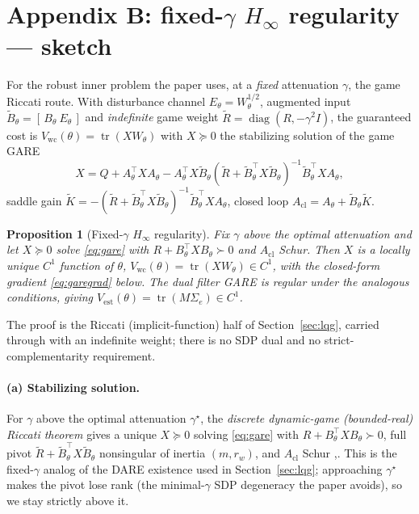 \documentclass[11pt]{article}
\newtheorem{proposition}{Proposition}
\theoremstyle{definition}
\DeclareMathOperator{\tr}{tr}
\DeclareMathOperator{\diag}{diag}
\newcommand{\Acl}{A_{\mathrm{cl}}}
\newcommand{\Th}{\theta}
\newcommand{\half}{{1/2}}
\newcommand{\Vwc}{V_{\mathrm{wc}}}
\newcommand{\Vest}{V_{\mathrm{est}}}
\begin{document}
\section{Appendix B: fixed-$\gamma$ $H_\infty$ regularity --- sketch}\label{sec:hinf}

For the robust inner problem the paper uses, at a \emph{fixed} attenuation
$\gamma$, the game Riccati route. With disturbance channel $E_\Th=W_\Th^{\half}$,
augmented input $\tilde B_\Th=[\,B_\Th\ E_\Th\,]$ and \emph{indefinite} game weight
$\tilde R=\diag(R,-\gamma^2I)$, the guaranteed cost is
$\Vwc(\Th)=\tr(XW_\Th)$ with $X\succeq0$ the stabilizing solution of the game GARE
\begin{equation}\label{eq:gare}
X=Q+A_\Th^\top XA_\Th-A_\Th^\top X\tilde B_\Th
(\tilde R+\tilde B_\Th^\top X\tilde B_\Th)^{-1}\tilde B_\Th^\top XA_\Th,
\end{equation}
saddle gain $\tilde K=-(\tilde R+\tilde B_\Th^\top X\tilde B_\Th)^{-1}
\tilde B_\Th^\top XA_\Th$, closed loop $\Acl=A_\Th+\tilde B_\Th\tilde K$.

\begin{proposition}[Fixed-$\gamma$ $H_\infty$ regularity]\label{prop:hinf}
Fix $\gamma$ above the optimal attenuation and let $X\succeq0$ solve \eqref{eq:gare}
with $R+B_\Th^\top XB_\Th\succ0$ and $\Acl$ Schur. Then $X$ is a locally unique
$C^1$ function of $\Th$, $\Vwc(\Th)=\tr(XW_\Th)\in C^1$, with the closed-form
gradient \eqref{eq:garegrad} below. The dual filter GARE is regular under the
analogous conditions, giving $\Vest(\Th)=\tr(M\Sigma_e)\in C^1$.
\end{proposition}

\noindent The proof is the Riccati (implicit-function) half of
Section~\ref{sec:lqg}, carried through with an indefinite weight; there is no SDP
dual and no strict-complementarity requirement.

\paragraph{(a) Stabilizing solution.}
For $\gamma$ above the optimal attenuation $\gamma^\star$, the \emph{discrete
dynamic-game (bounded-real) Riccati theorem} gives a unique $X\succeq0$ solving
\eqref{eq:gare} with $R+B_\Th^\top XB_\Th\succ0$, full pivot
$\tilde R+\tilde B_\Th^\top X\tilde B_\Th$ nonsingular of inertia $(m,r_w)$, and
$\Acl$ Schur \cite{BasarBernhard},\cite[Ch.~2]{BoydLMI}. This is the fixed-$\gamma$
analog of the DARE existence used in Section~\ref{sec:lqg}; approaching
$\gamma^\star$ makes the pivot lose rank (the minimal-$\gamma$ SDP degeneracy the
paper avoids), so we stay strictly above it.
\end{document}
